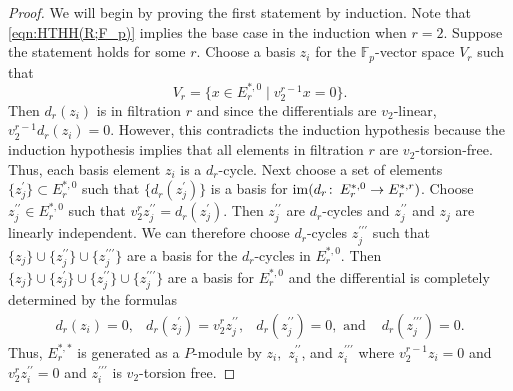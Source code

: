 \begin{proof}
We will begin by proving the first statement by induction. Note that \eqref{eqn:HTHH(R;F_p)} implies the base case in the induction when $r=2$. Suppose the statement holds for some $r$. Choose a basis $z_i$ for the $\mathbb{F}_p$-vector space $V_r$ such that 
\[V_r=\{ x \in E_r^{*,0}\mid v_2^{r-1}x=0\}.\] 
Then $d_r(z_i)$ is in filtration $r$ and since the differentials are $v_2$-linear, $v_2^{r-1}d_r(z_i)=0$. However, this contradicts the induction hypothesis because the induction hypothesis implies that all elements in filtration $r$ are $v_2$-torsion-free. Thus, each basis element $z_i$ is a $d_r$-cycle. Next choose a set of elements $\{z^{\prime}_j\}\subset E_r^{*,0}$ such that $\{d_r(z_j^{\prime})\}$ is a basis for $\operatorname{im}(d_r\colon \thinspace E_r^{*,0}\to E_r^{*,r})$. Choose $z^{\prime\prime}_j\in E_r^{*,0}$ such that $v_2^{r}z^{\prime\prime}_j=d_r(z_j^{\prime})$. Then $z^{\prime\prime}_j$ are $d_r$-cycles and $z^{\prime \prime}_j$ and $z_j$ are linearly independent. We can therefore choose $d_r$-cycles $z^{\prime \prime\prime}_j$ such that $\{z_j\}\cup\{z_j^{\prime\prime}\}\cup\{z_j^{\prime\prime\prime}\}$ are a basis for the $d_r$-cycles in $E_{r}^{*,0}$. Then 
$\{z_j\}\cup\{z_j^{\prime}\}\cup \{z_j^{\prime\prime}\}\cup\{z_j^{\prime\prime\prime}\}$
are a basis for $E_r^{*,0}$ and the differential is completely determined by the formulas
\[ \begin{array}{cccc} d_r(z_i)=0 , &d_r(z_j^{\prime})=v_2^{r}z_j^{\prime \prime}, & d_r(z_j^{\prime \prime})=0, \text{ and } & d_r(z_j^{\prime \prime \prime})=0. \end{array}\]
Thus, $E_r^{*,*}$ is generated as a $P$-module by $z_i,$ $z_i^{\prime \prime}$, and $z_i^{\prime \prime\prime}$ where $v_2^{r-1}z_i=0$ and $v_2^rz_i^{\prime \prime}=0$ and $z_i^{\prime \prime \prime}$ is $v_2$-torsion free. \end{proof}
